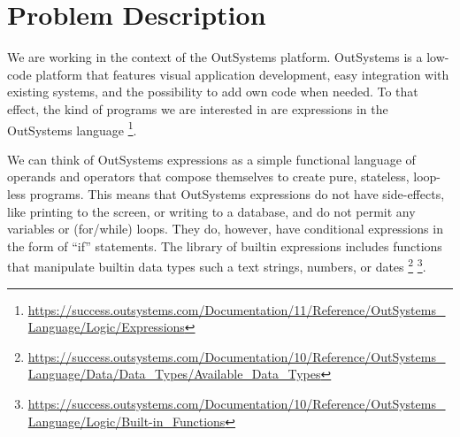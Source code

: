 \section{Problem Description}
\label{sec:problem-description}

We are working in the context of the OutSystems platform. OutSystems is a
low-code platform that features visual application development, easy integration
with existing systems, and the possibility to add own code when needed. To that
effect, the kind of programs we are interested in are expressions in the
OutSystems language
\footnote{\url{https://success.outsystems.com/Documentation/11/Reference/OutSystems_Language/Logic/Expressions}}.

We can think of OutSystems expressions as a simple functional language of
operands and operators that compose themselves to create pure, stateless,
loop-less programs. This means that OutSystems expressions do not have
side-effects, like printing to the screen, or writing to a database, and do not
permit any variables or (for/while) loops. They do, however, have conditional
expressions in the form of ``if'' statements. The library of builtin expressions
includes functions that manipulate builtin data types such a text strings,
numbers, or dates
\footnote{\url{https://success.outsystems.com/Documentation/10/Reference/OutSystems_Language/Data/Data_Types/Available_Data_Types}}
\footnote{\url{https://success.outsystems.com/Documentation/10/Reference/OutSystems_Language/Logic/Built-in_Functions}}.

